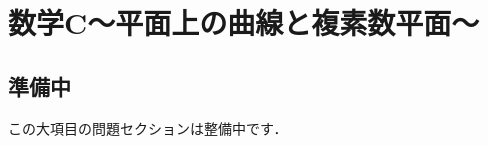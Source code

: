 \documentclass[../../ms_q.tex]{subfiles}
\begin{document}
\section{数学C～平面上の曲線と複素数平面～}

\subsection*{準備中}
この大項目の問題セクションは整備中です．
\end{document}
